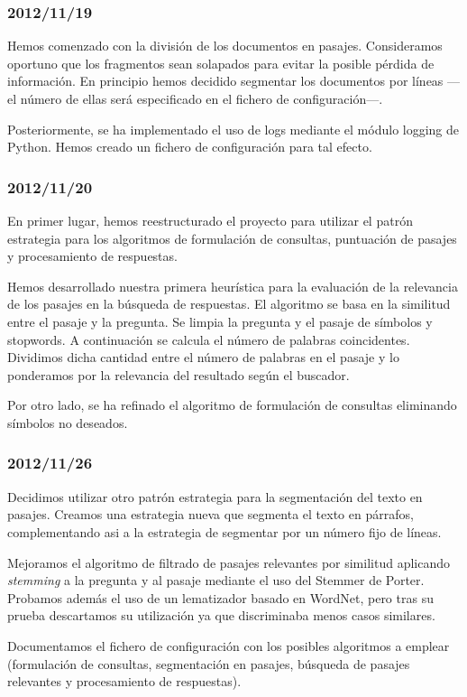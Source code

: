 \documentclass[12pt,a4paper,titlepage]{article}
\begin{document}
\subsubsection*{2012/11/19}
Hemos comenzado con la división de los documentos en pasajes. Consideramos oportuno que los fragmentos sean solapados para evitar la posible pérdida de información. En principio hemos decidido segmentar los documentos por líneas ---el número de ellas será especificado en el fichero de configuración---.

Posteriormente, se ha implementado el uso de logs mediante el módulo logging de Python. Hemos creado un fichero de configuración para tal efecto.

\subsubsection*{2012/11/20}
En primer lugar, hemos reestructurado el proyecto para utilizar el patrón estrategia para los algoritmos de formulación de consultas, puntuación de pasajes y procesamiento de respuestas.

Hemos desarrollado nuestra primera heurística para la evaluación de la relevancia de los pasajes en la búsqueda de respuestas. El algoritmo se basa en la similitud entre el pasaje y la pregunta. Se limpia la pregunta y el pasaje de símbolos y stopwords. A continuación se calcula el número de palabras coincidentes. Dividimos dicha cantidad entre el número de palabras en el pasaje y lo ponderamos por la relevancia del resultado según el buscador.

Por otro lado, se ha refinado el algoritmo de formulación de consultas eliminando símbolos no deseados.

\subsubsection*{2012/11/26}
Decidimos utilizar otro patrón estrategia para la segmentación del texto en pasajes. Creamos una estrategia nueva que segmenta el texto en párrafos, complementando asi a la estrategia de segmentar por un número fijo de líneas.

Mejoramos el algoritmo de filtrado de pasajes relevantes por similitud aplicando \emph{stemming} a la pregunta y al pasaje mediante el uso del Stemmer de Porter. Probamos además el uso de un lematizador basado en WordNet, pero tras su prueba descartamos su utilización ya que discriminaba menos casos similares.

Documentamos el fichero de configuración con los posibles algoritmos a emplear (formulación de consultas, segmentación en pasajes, búsqueda de pasajes relevantes y procesamiento de respuestas).
\end{document}
